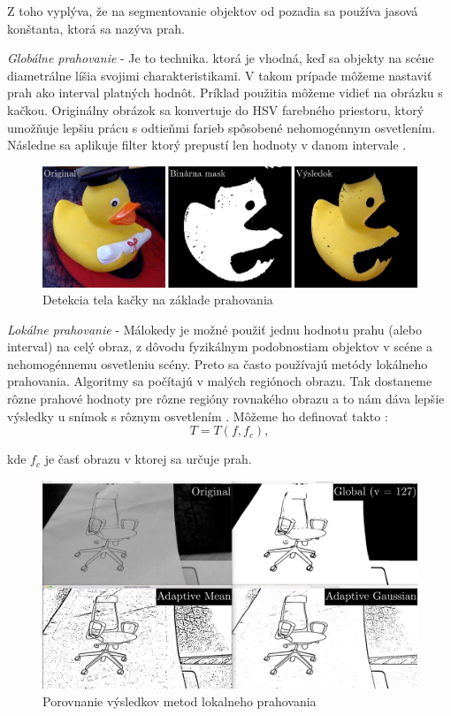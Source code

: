 Z toho vyplýva, že na segmentovanie objektov od pozadia sa používa jasová konštanta, ktorá sa nazýva prah. 


\textit{Globálne prahovanie} - Je to technika. ktorá je vhodná, keď sa objekty na scéne diametrálne líšia svojimi charakteristikami. V takom prípade môžeme nastaviť prah ako interval platných hodnôt. Príklad použitia môžeme vidieť na obrázku s kačkou. Originálny obrázok sa konvertuje do HSV farebného priestoru, ktorý umožňuje lepšiu prácu s odtieňmi farieb spôsobené nehomogénnym osvetlením. Následne sa aplikuje filter ktorý prepustí len hodnoty v danom intervale \cite{fit_trasholding}.

\begin{figure}[H]
\begin{center}
	\includegraphics[scale=0.25]{images/trasholding_duck}
	\caption{Detekcia tela kačky na základe prahovania}
	\end{center}
\end{figure}


\textit{Lokálne prahovanie} - Málokedy je možné použiť jednu hodnotu prahu (alebo interval) na celý obraz, z dôvodu fyzikálnym podobnostiam objektov v scéne a  nehomogénnemu osvetleniu scény. Preto sa často používajú metódy lokálneho prahovania. Algoritmy sa počítajú v malých regiónoch obrazu. Tak dostaneme rôzne prahové hodnoty pre rôzne regióny rovnakého obrazu a to nám dáva lepšie výsledky u snímok s rôznym osvetlením \cite{fit_trasholding}\cite{openCV_trasholding}. Môžeme ho definovať takto : 
$$T=T(f {,} f_c){,}$$

kde $f_c$ je časť obrazu v ktorej sa určuje prah. 

\begin{figure}[H]
\begin{center}
	\includegraphics[scale=0.15]{images/trasholding}
	\caption{Porovnanie výsledkov metod lokalneho prahovania}
	\end{center}
\end{figure}



